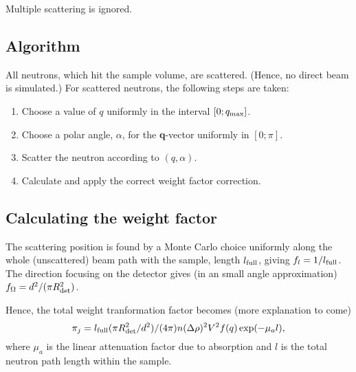 Multiple scattering is ignored.

\subsection{Algorithm}
All neutrons, which hit the sample volume, are scattered.
(Hence, no direct beam is simulated.)
For scattered neutrons, the following steps are taken:
\begin{enumerate}
\item Choose a value of $q$ uniformly in the interval $[0;q_{\rm max}]$.
\item Choose a polar angle, $\alpha$,
  for the {\bf q}-vector uniformly in $[0;\pi]$.
\item Scatter the neutron according to $(q,\alpha)$.
\item Calculate and apply the correct weight factor correction.
\end{enumerate}

\subsection{Calculating the weight factor}
The scattering position is found by a Monte Carlo choice uniformly
along the whole (unscattered) beam path with the sample, length $l_{\rm full}$, giving 
$f_l = 1/l_{\rm full}$. The direction focusing on the detector gives
(in an small angle approximation) $f_\Omega = d^2 / (\pi R_{\rm det}^2)$.

Hence, the total weight tranformation factor becomes (more explanation to come)
\begin{equation}
\pi_j = l_{\rm full} (\pi R_{\rm det}^2 / d^2)/(4 \pi)
  n (\Delta\rho)^2 V^2 f(q) \exp(-\mu_a l) , 
\end{equation}
where $\mu_a$ is the linear attenuation factor due to absorption
and $l$ is the total neutron path length within the sample.
 
